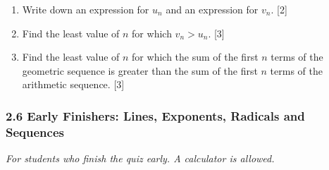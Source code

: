 \documentclass[12pt, twoside]{article}
\begin{document}
\begin{enumerate}[itemsep=0.15cm]
\begin{enumerate}[itemsep=0.1cm]
  \item Write down an expression for $u_{n}$ and an expression for $v_{n}$.
  \hfill [2]
  \item Find the least value of $n$ for which $v_{n} > u_{n}$. \hfill [3]
  \item Find the least value of $n$ for which the sum of the first $n$ terms
  of the geometric sequence is greater than the sum of the first $n$ terms
  of the arithmetic sequence. \hfill [3]
\end{enumerate}


\end{enumerate}

\newpage

\subsubsection*{2.6 Early Finishers: Lines, Exponents, Radicals and Sequences}

\emph{For students who finish the quiz early. A calculator is allowed.}
\end{document}
